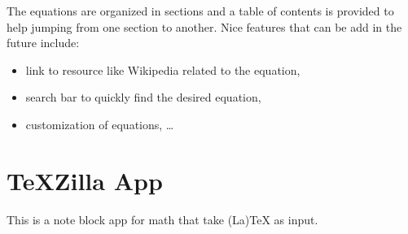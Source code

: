 The equations are organized in sections and a table of contents is provided to
help jumping from one section to another. Nice features that can be add in the
future include:
\begin{itemize}
  \item link to resource like Wikipedia related to the equation,
  \item search bar to quickly find the desired equation,
  \item customization of equations, \ldots
\end{itemize}

\section{TeXZilla App}

This is a note block app for math that take (La)TeX as input.
